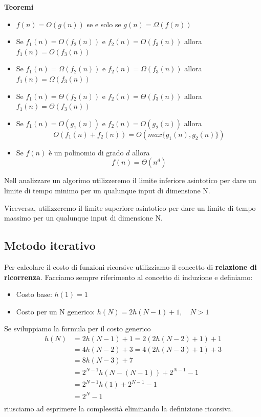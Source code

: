 \documentclass{article}
\begin{document}
\noindent\textbf{Teoremi}
\begin{itemize}
    \item \(f(n) = O\left(g(n)\right)\) se e solo se \(g(n) = \Omega\left(f(n)\right)\)
    \item Se \(f_1(n) = O\left(f_2(n)\right)\) e \(f_2(n) = O\left(f_3(n)\right)\) allora \(f_1(n) = O\left(f_3 (n)\right)\)
    \item Se \(f_1(n) = \Omega\left(f_2(n)\right)\) e \(f_2(n) = \Omega\left(f_3(n)\right)\) allora \(f_1(n) = \Omega\left(f_3 (n)\right)\)
    \item Se \(f_1(n) = \Theta\left(f_2(n)\right)\) e \(f_2(n) = \Theta\left(f_3(n)\right)\) allora \(f_1(n) = \Theta\left(f_3 (n)\right)\)
    \item Se \(f_1(n) = O\left(g_1(n)\right)\) e \(f_2(n) = O\left(g_2(n)\right)\) allora \[O\left(f_1(n) + f_2(n)\right) = O\left(max\{g_1(n), g_2(n)\}\right)\]
    \item Se \(f(n)\) è un polinomio di grado \(d\) allora \[f(n) = \Theta\left(n^d\right)\]
\end{itemize}

Nell analizzare un algorimo utilizzeremo il limite inferiore asintotico per dare un limite di tempo minimo per un qualunque input di dimensione N.

Viceversa, utilizzeremo il limite superiore asintotico per dare un limite di tempo massimo per un qualunque input di dimensione N.

\subsection{Metodo iterativo}
Per calcolare il costo di funzioni ricorsive utilizziamo il concetto di \textbf{relazione di ricorrenza}.
Facciamo sempre riferimento al concetto di induzione e definiamo:
\begin{itemize}
    \item Costo base: \(h(1) = 1\)
    \item Costo per un N generico: \(h(N) = 2h(N - 1) + 1,\quad N > 1\)
\end{itemize}
Se sviluppiamo la formula per il costo generico
\begin{align*}
    h(N) & = 2h(N - 1) + 1 = 2(2h(N - 2) + 1) + 1           \\
         & = 4h(N - 2) + 3 = 4(2h(N - 3) + 1) + 3           \\
         & = 8h(N - 3) + 7                                  \\
         & = 2^{N-1}h\left(N - (N - 1)\right) + 2^{N-1} - 1 \\
         & = 2^{N-1}h(1) + 2^{N-1} - 1                      \\
         & = 2^{N} - 1                                      \\
\end{align*}
riusciamo ad esprimere la complessità eliminando la definizione ricorsiva.
\end{document}
